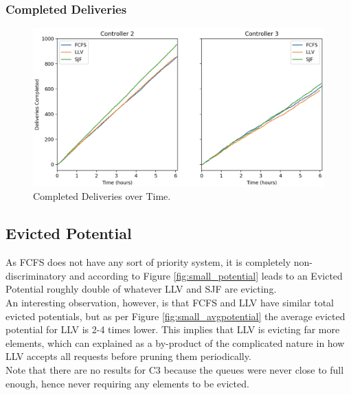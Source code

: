 \documentclass[a4paper,11pt,titlepage]{report}
\begin{document}
\subsubsection{Completed Deliveries}
\begin{figure}[!hbpt]
  \center
  \includegraphics[width=\linewidth]{img/small/deliveries.png}
  \caption{Completed Deliveries over Time.}
  \label{fig:small_deliveries}
\end{figure}

\subsection{Evicted Potential}
As FCFS does not have any sort of priority system, it is completely non-discriminatory and according to Figure \ref{fig:small_potential} leads to an Evicted Potential roughly double of whatever LLV and SJF are evicting.\\

An interesting observation, however, is that FCFS and LLV have similar total evicted potentials, but as per Figure \ref{fig:small_avgpotential} the average evicted potential for LLV is 2-4 times lower. This implies that LLV is evicting far more elements, which can explained as a by-product of the complicated nature in how LLV accepts all requests before pruning them periodically.\\

Note that there are no results for C3 because the queues were never close to full enough, hence never requiring any elements to be evicted.

\clearpage
\end{document}
